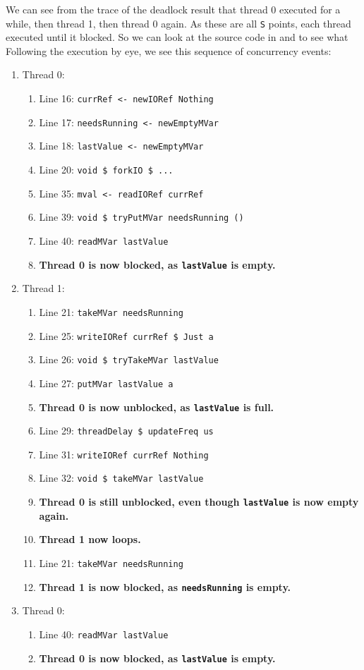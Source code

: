 We can see from the trace of the deadlock result that thread 0
executed for a while, then thread 1, then thread 0 again.  As these
are all \verb|S| points, each thread executed until it blocked.  So we
can look at the source code in  and
 to see what Following the execution by eye, we
see this sequence of concurrency events:

\begin{enumerate}
\item Thread 0:
  \begin{enumerate}
  \item Line 16: \verb|currRef <- newIORef Nothing|
  \item Line 17: \verb|needsRunning <- newEmptyMVar|
  \item Line 18: \verb|lastValue <- newEmptyMVar|
  \item Line 20: \verb|void $ forkIO $ ...|
  \item Line 35: \verb|mval <- readIORef currRef|
  \item Line 39: \verb|void $ tryPutMVar needsRunning ()|
  \item Line 40: \verb|readMVar lastValue|
  \item \textbf{Thread 0 is now blocked, as \texttt{lastValue} is empty.}
  \end{enumerate}
\item Thread 1:
  \begin{enumerate}
  \item Line 21: \verb|takeMVar needsRunning|
  \item Line 25: \verb|writeIORef currRef $ Just a|
  \item Line 26: \verb|void $ tryTakeMVar lastValue|
  \item Line 27: \verb|putMVar lastValue a|
  \item \textbf{Thread 0 is now unblocked, as \texttt{lastValue} is full.}
  \item Line 29: \verb|threadDelay $ updateFreq us|
  \item Line 31: \verb|writeIORef currRef Nothing|
  \item Line 32: \verb|void $ takeMVar lastValue|
  \item \textbf{Thread 0 is still unblocked, even though \texttt{lastValue} is now empty again.}
  \item \textbf{Thread 1 now loops.}
  \item Line 21: \verb|takeMVar needsRunning|
  \item \textbf{Thread 1 is now blocked, as \texttt{needsRunning} is empty.}
  \end{enumerate}
\item Thread 0:
  \begin{enumerate}
  \item Line 40: \verb|readMVar lastValue|
  \item \textbf{Thread 0 is now blocked, as \texttt{lastValue} is empty.}
  \end{enumerate}
\end{enumerate}

